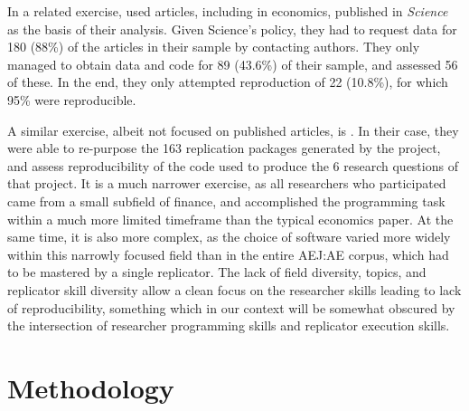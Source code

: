 \documentclass{cje} %
\theoremstyle{plain}%
\theoremstyle{definition}
\theoremstyle{remark}
\begin{document}
In a related exercise, \citet{Stodden2018} used articles, including in economics, published in \textit{Science} as the basis of their analysis. Given Science's policy, they had to request data for 180 (88\%) of the articles in their sample by contacting authors.  They only managed to obtain data and code for 89 (43.6\%) of their sample, and assessed 56 of these. In the end, they only attempted reproduction of 22 (10.8\%), for which 95\% were reproducible. 

A similar exercise, albeit not focused on published articles, is \citet{perignon2022}. In their case, they were able to re-purpose the 163 replication packages generated by the \citet{menkveld2023} project, and assess reproducibility of the code used to produce the 6 research questions of that project. It is a much narrower exercise, as all researchers who participated came from a small subfield of finance, and accomplished the programming task within a much more limited timeframe than the typical economics paper. At the same time, it is also more complex, as the choice of software varied more widely within this narrowly focused field than in the entire \ac{AEJ:AE} corpus, which had to be mastered by a single replicator. The lack of field diversity, topics, and replicator skill diversity allow a clean focus on the researcher skills leading to lack of reproducibility, something which in our context will be somewhat obscured by the intersection of researcher programming skills and replicator execution skills.
%
%
\section{Methodology}\label{sec:methodology}

\end{document}
